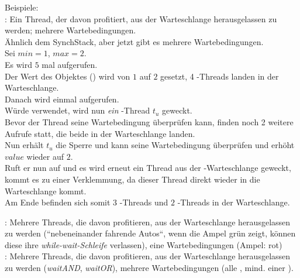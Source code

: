 \noindent
Beispiele:\\

\noindent
{}: Ein Thread, der davon profitiert, aus der Warteschlange herausgelassen zu werden; mehrere Wartebedingungen.\\
Ähnlich dem SynchStack, aber jetzt gibt es mehrere Wartebedingungen.\\

\noindent
Sei $min = 1$, $max = 2$.\\
Es wird $5$ mal  aufgerufen.\\
Der Wert des Objektes () wird von $1$ auf $2$ gesetzt, 4 -Threads landen in der Warteschlange.\\
Danach wird einmal  aufgerufen.\\
Würde  verwendet, wird nun \textit{ein} -Thread $t_u$ geweckt.\\
Bevor der Thread seine Wartebedingung überprüfen kann, finden noch 2 weitere  Aufrufe statt, die beide in der Warteschlange landen.\\
Nun erhält $t_u$ die Sperre und kann seine Wartebedingung überprüfen und erhöht $value$ wieder auf $2$.\\
Ruft er nun  auf und es wird erneut ein Thread aus der -Warteschlange geweckt, kommt es zu einer Verklemmung, da dieser Thread direkt wieder in die Warteschlange kommt.\\
Am Ende befinden sich somit $3$ -Threads und $2$ -Threads in der Warteschlange.

\noindent
{}: Mehrere Threads, die davon profitieren, aus der Warteschlange herausgelassen zu werden (``nebeneinander fahrende Autos``, wenn die Ampel grün zeigt, können diese ihre \textit{while-wait-Schleife} verlassen), eine Wartebedingungen (Ampel: rot)\\

\noindent
{}: Mehrere Threads, die davon profitieren, aus der Warteschlange herausgelassen zu werden (\textit{waitAND}, \textit{waitOR}), mehrere Wartebedingungen (alle , mind. einer ).







